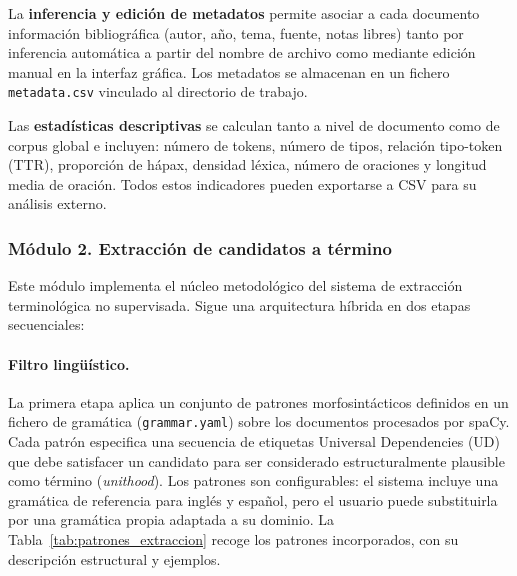 La \textbf{inferencia y edición de metadatos} permite asociar a cada documento información bibliográfica (autor, año, tema, fuente, notas libres) tanto por inferencia automática a partir del nombre de archivo como mediante edición manual en la interfaz gráfica. Los metadatos se almacenan en un fichero \texttt{metadata.csv} vinculado al directorio de trabajo.

Las \textbf{estadísticas descriptivas} se calculan tanto a nivel de documento como de corpus global e incluyen: número de tokens, número de tipos, relación tipo-token (TTR), proporción de hápax, densidad léxica, número de oraciones y longitud media de oración. Todos estos indicadores pueden exportarse a CSV para su análisis externo.

\subsubsection*{Módulo 2. Extracción de candidatos a término}

Este módulo implementa el núcleo metodológico del sistema de extracción terminológica no supervisada. Sigue una arquitectura híbrida en dos etapas secuenciales:

\paragraph{Filtro lingüístico.} La primera etapa aplica un conjunto de patrones morfosintácticos definidos en un fichero de gramática (\texttt{grammar.yaml}) sobre los documentos procesados por spaCy. Cada patrón especifica una secuencia de etiquetas Universal Dependencies (UD) que debe satisfacer un candidato para ser considerado estructuralmente plausible como término (\textit{unithood}). Los patrones son configurables: el sistema incluye una gramática de referencia para inglés y español, pero el usuario puede substituirla por una gramática propia adaptada a su dominio. La Tabla~\ref{tab:patrones_extraccion} recoge los patrones incorporados, con su descripción estructural y ejemplos.

